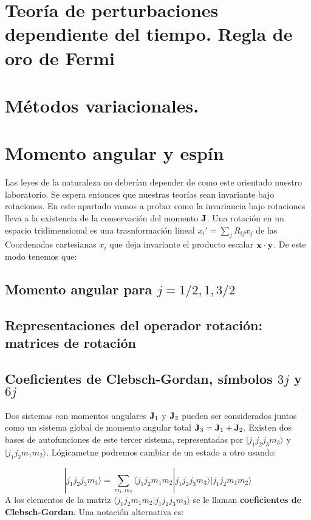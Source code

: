 \section{Teoría de perturbaciones dependiente del tiempo. Regla de oro de Fermi}


\section{Métodos variacionales.}

\section{Momento angular y espín}

Las leyes de la naturaleza no deberían depender de como este orientado nuestro laboratorio. Se espera entonces que nuestras teorías sean invariante bajo rotaciones. En este apartado vamos a probar como la invariancia bajo rotaciones lleva a la existencia de la conservación del momento $\mathbf{J}$. Una rotación en un espacio tridimensional es una trasnformación lineal $x_i'=\sum_j R_{ij} x_j$ de las Coordenadas cartesianas  $x_i$ que deja invariante el producto escalar $\mathbf{x} \cdot \mathbf{y}$. De este modo tenemos que:

\subsection{Momento angular para $j=1/2,1,3/2$}

\subsection{Representaciones del operador rotación: matrices de rotación}


\subsection{Coeficientes de Clebsch-Gordan, símbolos $3j$ y $6j$}

Dos sistemas con momentos angulares $\mathbf{J}_1$ y $\mathbf{J}_2$ pueden ser considerados juntos como un sistema global de momento angular total $\mathbf{J}_3 = \mathbf{J}_1 + \mathbf{J}_2$. Existen dos bases de autofunciones de este tercer sistema, representadas por $|j_1 j_2 j_3 m_3\rangle$ y $|j_1 j_2 m_1 m_2\rangle$. Lógicametne podremos cambiar de un estado a otro usando:

\begin{equation}
   |j_1 j_2 j_3 m_3 \rangle  = \sum_{m_1, m_2}  \langle j_1 j_2 m_1 m_2 | j_1 j_2 j_3 m_3 \rangle    |j_1 j_2 m_1 m_2\rangle
\end{equation}
A los elementos de la matriz $\langle j_1 j_2 m_1 m_2 | j_1 j_2 j_3 m_3 \rangle$ se le llaman \textbf{coeficientes de Clebsch-Gordan}. Una notación alternativa es:

